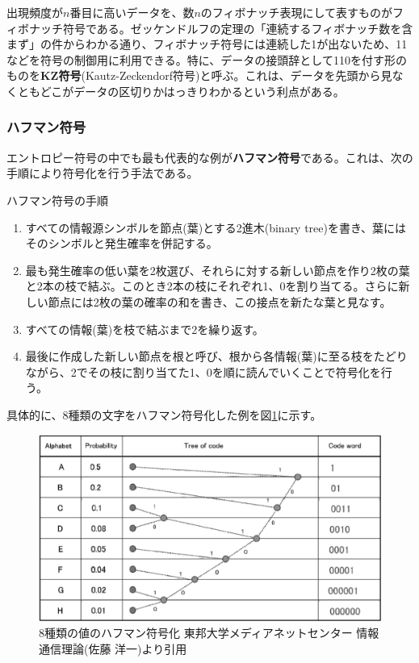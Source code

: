 出現頻度が$n$番目に高いデータを、数$n$のフィボナッチ表現にして表すものがフィボナッチ符号である。ゼッケンドルフの定理の「連続するフィボナッチ数を含まず」の件からわかる通り、フィボナッチ符号には連続した1が出ないため、11などを符号の制御用に利用できる。特に、データの接頭辞として110を付す形のものを\textbf{KZ符号}(Kautz-Zeckendorf符号)と呼ぶ。これは、データを先頭から見なくともどこがデータの区切りかはっきりわかるという利点がある。

\subsubsection{ハフマン符号}
エントロピー符号の中でも最も代表的な例が\textbf{ハフマン符号}である。これは、次の手順により符号化を行う手法である。

\begin{itembox}[l]{ハフマン符号の手順}
\begin{enumerate}
\item すべての情報源シンボルを節点(葉)とする2進木(binary tree)を書き、葉にはそのシンボルと発生確率を併記する。
\item 最も発生確率の低い葉を2枚選び、それらに対する新しい節点を作り2枚の葉と2本の枝で結ぶ。このとき2本の枝にそれぞれ1、0を割り当てる。さらに新しい節点には2枚の葉の確率の和を書き、この接点を新たな葉と見なす。
\item すべての情報(葉)を枝で結ぶまで2を繰り返す。
\item 最後に作成した新しい節点を根と呼び、根から各情報(葉)に至る枝をたどりながら、2でその枝に割り当てた1、0を順に読んでいくことで符号化を行う。
\end{enumerate}
\end{itembox}

具体的に、8種類の文字をハフマン符号化した例を図\ref{fig1_1}に示す。
\begin{figure}[htb]
\centering
\includegraphics[width=0.8\linewidth,keepaspectratio]{fig/fig1_1.eps}
\caption{8種類の値のハフマン符号化 東邦大学メディアネットセンター 情報通信理論(佐藤 洋一)より引用} \label{fig1_1}
\end{figure}


